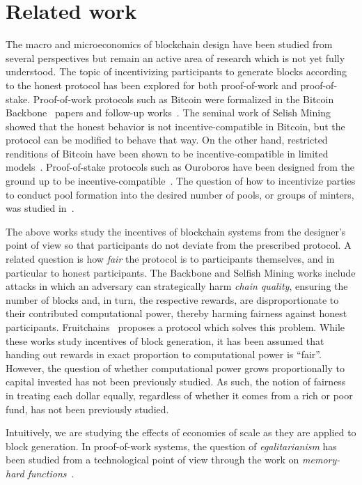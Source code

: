 \section{Related work}\label{sec:related}
The macro and microeconomics of blockchain design have
been studied from several perspectives but remain an active area of research
which is not yet fully understood. The topic of incentivizing participants to
generate blocks according to the honest protocol has been explored for both
proof-of-work and proof-of-stake. Proof-of-work protocols such as Bitcoin were
formalized in the Bitcoin Backbone~\cite{EC:GarKiaLeo15,C:GarKiaLeo17} papers and
follow-up works~\cite{pass}. The seminal work of Selish Mining~\cite{selfish}
showed that the honest behavior is not incentive-compatible in Bitcoin, but the
protocol can be modified to behave that way. On the other hand, restricted
renditions of Bitcoin have been shown to be incentive-compatible in limited
models~\cite{tselekounis-kiayias}. Proof-of-stake protocols such as Ouroboros
have been designed from the ground up to be
incentive-compatible~\cite{ouroboros}. The question of how to incentivize
parties to conduct pool formation into the desired number of pools, or groups of minters, was studied
in~\cite{stouka-koutsoupias-kiayias}.

The above works study the incentives of blockchain systems from the designer's
point of view so that participants do not deviate from the prescribed protocol.
A related question is how \emph{fair} the protocol is to participants
themselves, and in particular to honest participants. The Backbone and Selfish
Mining works include attacks in which an adversary can strategically harm
\emph{chain quality}, ensuring the number of blocks and, in turn, the respective
rewards, are disproportionate to their contributed computational power, thereby
harming fairness against honest participants. Fruitchains~\cite{fruitchains}
proposes a protocol which solves this problem.
While these works study incentives of block generation, it has been
assumed that handing out rewards in exact proportion to computational power is
``fair''. However, the question of whether computational power grows proportionally
to capital invested has not been previously studied. As such, the notion of
fairness in treating each dollar equally, regardless of whether it comes from a
rich or poor fund, has not been previously studied.

Intuitively, we are studying the effects of economies of scale as they are
applied to block generation.
In proof-of-work systems, the question of \emph{egalitarianism} has been studied
from a technological point of view through the work on \emph{memory-hard functions}~\cite{pebbling}.

